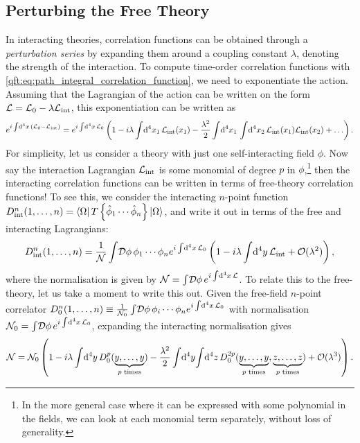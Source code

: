 \documentclass[../main.tex]{subfiles}
\begin{document}
\subsection{Perturbing the Free Theory}
In interacting theories, correlation functions can be obtained through a \emph{perturbation series} by expanding them around a coupling constant \(\lambda\), denoting the strength of the interaction.
To compute time-order correlation functions with \cref{qft:eq:path_integral_correlation_function}, we need to exponentiate the action.
Assuming that the Lagrangian of the action can be written on the form \(\mathcal{L} = \mathcal{L}_0 - \lambda\mathcal{L}_\text{int}\), this exponentiation can be written as
\begin{align}
  e^{i \int \!\mathrm{d}^4x\, \left(\mathcal{L}_0 - \mathcal{L}_\text{int}\right)} = e^{i \int \!\mathrm{d}^4x\, \mathcal{L}_0} \left(1 - i\lambda\int \!\mathrm{d}^4x_1\, \mathcal{L}_\text{int}(x_1) - \frac{\lambda^2}{2} \int \!\mathrm{d}^4x_1\,\int \!\mathrm{d}^4x_2\, \mathcal{L}_\text{int}(x_1) \mathcal{L}_\text{int}(x_2) + \ldots\right).
\end{align}
For simplicity, let us consider a theory with just one self-interacting field \(\phi\).
Now say the interaction Lagrangian \(\mathcal{L}_\text{int}\) is some monomial of degree \(p\) in \(\phi\),\footnote{In the more general case where it can be expressed with some polynomial in the fields, we can look at each monomial term separately, without loss of generality.} then the interacting correlation functions can be written in terms of free-theory correlation functions!
To see this, we consider the interacting \(n\)-point function \(D^n_\text{int}(1,\ldots, n) = \left\langle \Omega \right| T\left\{\hat\phi_1 \cdots \hat\phi_n\right\} \left| \Omega \right\rangle\), and write it out in terms of the free and interacting Lagrangians:
\begin{align}
  \label{qft:eq:n-point_interactive_correlator}
  D^n_\text{int}(1,\ldots, n) = \frac{1}{\mathcal{N}} \int\!\mathcal{D}\phi\, \phi_1\cdots \phi_n e^{i\int \!\mathrm{d}^4x\,\mathcal{L}_0}\left(1 - i\lambda \int \!\mathrm{d}^4y\,\mathcal{L}_\text{int} + \mathcal{O}(\lambda^2)\right),
\end{align}
where the normalisation is given by \(\mathcal{N} = \int\!\mathcal{D}\phi\, e^{i\int \!\mathrm{d}^4x\,\mathcal{L}}\).
To relate this to the free-theory, let us take a moment to write this out.
Given the free-field \(n\)-point correlator \(D^n_0(1,\ldots,n) \equiv \frac{1}{\mathcal{N}_0} \int\!\mathcal{D}\phi\, \phi_i \cdots \phi_n e^{i\int \!\mathrm{d}^4x\,\mathcal{L}_0}\) with normalisation \(\mathcal{N}_0 = \int\!\mathcal{D}\phi\, e^{i\int \!\mathrm{d}^4x\,\mathcal{L}_0}\), expanding the interacting normalisation gives
\begin{equation}
  \mathcal{N} = \mathcal{N}_0 \left(1 - i\lambda \int \!\mathrm{d}^4y\, D_0^p(\underbrace{y, \ldots, y}_{p\text{ times}}) - \frac{\lambda^2}{2} \int \!\mathrm{d}^4y\,\!\! \int \!\mathrm{d}^4z\, D_0^{2p}(\underbrace{y,\ldots,y}_{p\text{ times}}, \underbrace{z,\ldots,z}_{p\text{ times}}) + \mathcal{O}(\lambda^3)\right).
\end{equation}
\end{document}

